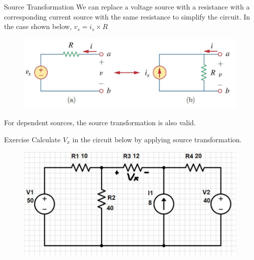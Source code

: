 \documentclass{beamer}
\begin{document}

\begin{frame}{Source Transformation}
We can replace a voltage source with a resistance with a
corresponding current source with the same resistance to simplify the circuit. 
\newline
In the case shown below, $v_s=i_s\times R$
\begin{figure}
\centering
\includegraphics[scale=0.8]{img_cir/5.png}
\end{figure}
For dependent sources, the source transformation is also valid.

\end{frame}


\begin{frame}{Exercise}
Calculate $V_x$ in the circuit below by applying source transformation.

\begin{figure}
\centering
\includegraphics[scale=0.5]{img_cir/6.png}
\end{figure}
\end{frame}

\end{document}
